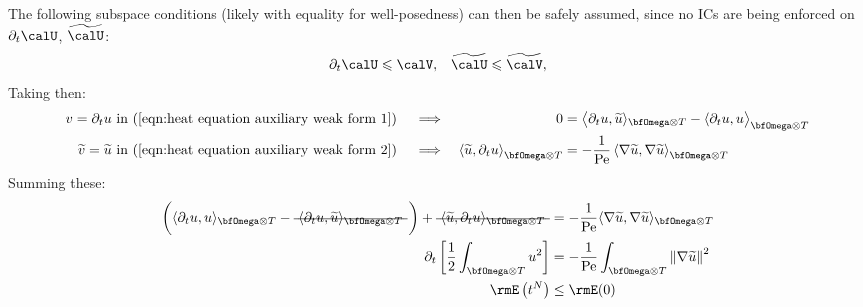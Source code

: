     The following subspace conditions (likely with equality for well-posedness) can then be safely assumed, since no ICs are being enforced on $\partial_{t}\calU$, $\widetilde{\calU}$:
    \begin{align}
        \partial_{t}\calU  \leqslant  \calV,  &&
        \widetilde{\calU}  \leqslant  \widetilde{\calV},  
    \end{align}
    Taking then:
    \begin{align}
        v  =  \partial_{t}u &\text{ in (\ref{eqn:heat equation auxiliary weak form 1})}  &&\implies  &  0  &=  \left\langle\partial_{t}u, \widetilde{u}\rangle_{\bfOmega\otimes T} - \langle\partial_{t}u, u\right\rangle_{\bfOmega\otimes T}  \\
        \widetilde{v}  = \widetilde{u} &\text{ in (\ref{eqn:heat equation auxiliary weak form 2})}  &&\implies  &  \left\langle\widetilde{u}, \partial_{t}u\right\rangle_{\bfOmega\otimes T}  &=  - \frac{1}{\rmPe}\left\langle\nabla\widetilde{u}, \nabla\widetilde{u}\right\rangle_{\bfOmega\otimes T}
    \end{align}
    Summing these:
    \begin{align}
        \left(\langle\partial_{t}u, u\rangle_{\bfOmega\otimes T} - \mst{\langle\partial_{t}u, \widetilde{u}\rangle_{\bfOmega\otimes T}}\tall\right) + \mst{\langle\widetilde{u}, \partial_{t}u\rangle_{\bfOmega\otimes T}} 
        &=  - \frac{1}{\rmPe}\langle\nabla\widetilde{u}, \nabla\widetilde{u}\rangle_{\bfOmega\otimes T}  \\
        \partial_{t}\left[\frac{1}{2}\int_{\bfOmega\otimes T}u^{2}\right]  &=  - \frac{1}{\rmPe}\int_{\bfOmega\otimes T}\left\|\nabla\widetilde{u}\right\|^{2}  \\
        \rmE\left(t^{N}\right)  &\leq  \rmE(0)
    \end{align}
    
